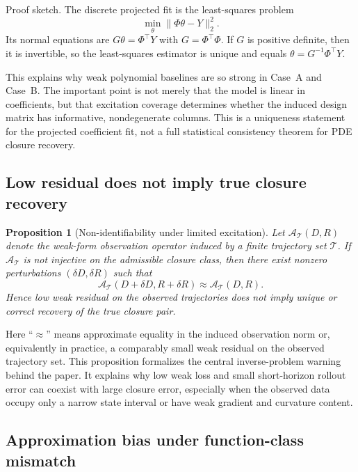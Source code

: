 \documentclass[preprint,12pt]{elsarticle}
\newtheorem{proposition}{Proposition}
\begin{document}
Proof sketch. The discrete projected fit is the least-squares problem
\begin{equation}
\min_\theta \|\Phi\theta - Y\|_2^2.
\end{equation}
Its normal equations are $G\theta = \Phi^\top Y$ with $G=\Phi^\top\Phi$. If $G$ is positive definite, then it is invertible, so the least-squares estimator is unique and equals $\theta = G^{-1}\Phi^\top Y$.

This explains why weak polynomial baselines are so strong in Case~A and Case~B. The important point is not merely that the model is linear in coefficients, but that excitation coverage determines whether the induced design matrix has informative, nondegenerate columns. This is a uniqueness statement for the projected coefficient fit, not a full statistical consistency theorem for PDE closure recovery.

\subsection{Low residual does not imply true closure recovery}

\begin{proposition}[Non-identifiability under limited excitation]
\label{prop:non_identifiability}
Let $\mathcal{A}_{\mathcal{T}}(D,R)$ denote the weak-form observation operator induced by a finite trajectory set $\mathcal{T}$. If $\mathcal{A}_{\mathcal{T}}$ is not injective on the admissible closure class, then there exist nonzero perturbations $(\delta D,\delta R)$ such that
\begin{equation}
\mathcal{A}_{\mathcal{T}}(D+\delta D,R+\delta R)
\approx
\mathcal{A}_{\mathcal{T}}(D,R).
\end{equation}
Hence low weak residual on the observed trajectories does not imply unique or correct recovery of the true closure pair.
\end{proposition}

Here ``$\approx$'' means approximate equality in the induced observation norm or, equivalently in practice, a comparably small weak residual on the observed trajectory set. This proposition formalizes the central inverse-problem warning behind the paper. It explains why low weak loss and small short-horizon rollout error can coexist with large closure error, especially when the observed data occupy only a narrow state interval or have weak gradient and curvature content.

\subsection{Approximation bias under function-class mismatch}
\end{document}
